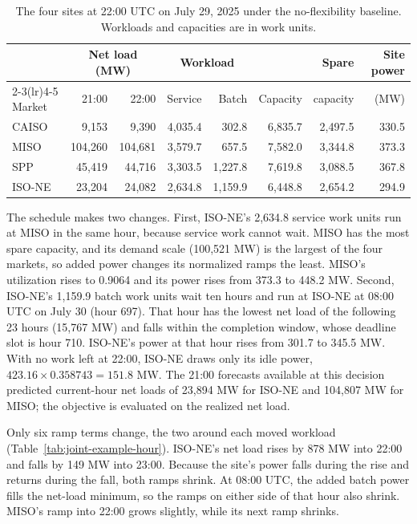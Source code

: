 \documentclass{UNCC-thesis}
\begin{document}
\begin{table}[htbp]
  \centering
  \footnotesize
  \caption[The four sites in the hour of the worked example]{The four sites at 22:00 UTC on July 29, 2025 under the no-flexibility baseline.
  Workloads and capacities are in work units.}
  \label{tab:joint-example-sites}
  \begin{tabular}{@{}lrrrrrrr@{}}
    \toprule
    & \multicolumn{2}{c}{Net load (MW)} & \multicolumn{2}{c}{Workload} & & Spare & Site power \\
    \cmidrule(lr){2-3}\cmidrule(lr){4-5}
    Market & 21:00 & 22:00 & Service & Batch & Capacity & capacity & (MW) \\
    \midrule
    CAISO  & 9,153   & 9,390   & 4,035.4 & 302.8   & 6,835.7 & 2,497.5 & 330.5 \\
    MISO   & 104,260 & 104,681 & 3,579.7 & 657.5   & 7,582.0 & 3,344.8 & 373.3 \\
    SPP    & 45,419  & 44,716  & 3,303.5 & 1,227.8 & 7,619.8 & 3,088.5 & 367.8 \\
    ISO-NE & 23,204  & 24,082  & 2,634.8 & 1,159.9 & 6,448.8 & 2,654.2 & 294.9 \\
    \bottomrule
  \end{tabular}
\end{table}

The schedule makes two changes. First, ISO-NE's 2,634.8 service work units run at MISO
in the same hour, because service work cannot wait. MISO has the most spare capacity, and
its demand scale (100,521 MW) is the largest of the four markets, so added power changes
its normalized ramps the least. MISO's utilization rises to 0.9064 and its power rises from
373.3 to 448.2 MW. Second, ISO-NE's 1,159.9 batch work units wait ten hours and run at
ISO-NE at 08:00 UTC on July 30 (hour 697). That hour has the lowest net load of the
following 23 hours (15,767 MW) and falls within the completion window, whose deadline
slot is hour 710. ISO-NE's power at that hour rises from 301.7 to 345.5 MW. With no work
left at 22:00, ISO-NE draws only its idle power, \(423.16\times0.358743=151.8\) MW.
The 21:00 forecasts available at this decision predicted current-hour net loads of
23,894 MW for ISO-NE and 104,807 MW for MISO; the objective is evaluated on the realized
net load.

Only six ramp terms change, the two around each moved workload
(Table~\ref{tab:joint-example-hour}). ISO-NE's net load rises by 878 MW into 22:00 and falls
by 149 MW into 23:00. Because the site's power falls during the rise and returns during
the fall, both ramps shrink. At 08:00 UTC, the added batch power fills the net-load
minimum, so the ramps on either side of that hour also shrink. MISO's ramp into 22:00
grows slightly, while its next ramp shrinks.
\end{document}
